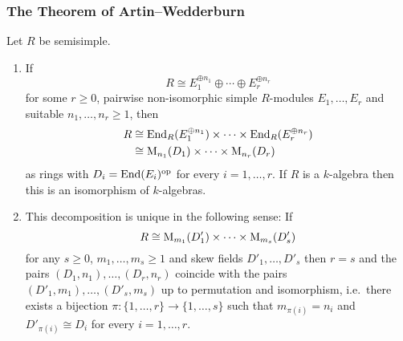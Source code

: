 \subsubsection{The Theorem of Artin--Wedderburn}


\begin{theorem}
  \label{theorem: artin wedderburn theorem}
  Let $R$ be semisimple.
  \begin{enumerate}
    \item
      If
      \[
              R
        \cong E_1^{\oplus n_1} \oplus \dotsb \oplus E_r^{\oplus n_r}
      \]
      for some $r \geq 0$, pairwise non-isomorphic simple $R$-modules $E_1, \dotsc, E_r$ and suitable $n_1, \dotsc, n_r \geq 1$, then
      \begin{align*}
                R
        &\cong  \operatorname{End}_R(E_1^{\oplus n_1}) \times \dotsb \times \operatorname{End}_R(E_r^{\oplus n_r})  \\
        &\cong  \operatorname{M}_{n_1}(D_1) \times \dotsb \times  \operatorname{M}_{n_r}(D_r)
      \end{align*}
      as rings with $D_i = \operatorname{End}(E_i)^{\operatorname{op}}$ for every $i = 1, \dotsc, r$.
      If $R$ is a $k$-algebra then this is an isomorphism of $k$-algebras.
    \item
      This decomposition is unique in the following sense:
      If
      \[
              R
        \cong \operatorname{M}_{m_1}(D'_1) \times \dotsb \times \operatorname{M}_{m_s}(D'_s)
      \]
      for any $s \geq 0$, $m_1, \dotsc, m_s \geq 1$ and skew fields $D'_1, \dotsc, D'_s$ then $r = s$ and the pairs $(D_1, n_1), \dotsc, (D_r, n_r)$ coincide with the pairs $(D'_1, m_1), \dotsc, (D'_s, m_s)$ up to permutation and isomorphism, i.e.\ there exists a bijection $\pi \colon \{1, \dotsc, r\} \to \{1, \dotsc, s\}$ such that $m_{\pi(i)} = n_i$ and $D'_{\pi(i)} \cong D_i$ for every $i = 1, \dotsc, r$.
  \end{enumerate}
\end{theorem}


